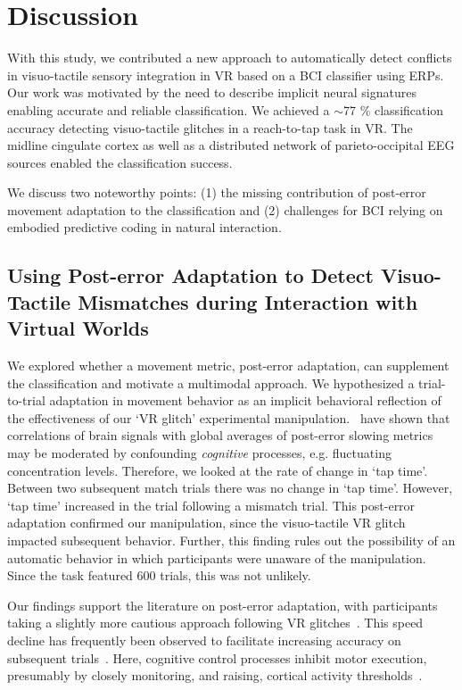 \section{Discussion}

With this study, we contributed a new approach to automatically detect conflicts in visuo-tactile sensory integration in VR based on a BCI classifier using ERPs. Our work was motivated by the need to describe implicit neural signatures enabling accurate and reliable classification. We achieved a $\sim$77 \% classification accuracy detecting visuo-tactile glitches in a reach-to-tap task in VR. The midline cingulate cortex as well as a distributed network of parieto-occipital EEG sources enabled the classification success.

We discuss two noteworthy points: (1) the missing contribution of post-error movement adaptation to the classification and (2) challenges for BCI relying on embodied predictive coding in natural interaction.

\subsection{Using Post-error Adaptation to Detect Visuo-Tactile Mismatches during Interaction with Virtual Worlds}

We explored whether a movement metric, post-error adaptation, can supplement the classification and motivate a multimodal approach. We hypothesized a trial-to-trial adaptation in movement behavior as an implicit behavioral reflection of the effectiveness of our `VR glitch' experimental manipulation.~\cite{Dutilh2012-ps} have shown that correlations of brain signals with global averages of post-error slowing metrics may be moderated by confounding \textit{cognitive} processes, e.g. fluctuating concentration levels. Therefore, we looked at the rate of change in `tap time'. Between two subsequent match trials there was no change in `tap time'. However, `tap time' increased in the trial following a mismatch trial. This post-error adaptation confirmed our manipulation, since the visuo-tactile VR glitch impacted subsequent behavior. Further, this finding rules out the possibility of an automatic behavior in which participants were unaware of the manipulation. Since the task featured 600 trials, this was not unlikely. 

Our findings support the literature on post-error adaptation, with participants taking a slightly more cautious approach following VR glitches~\cite{Rabbitt1977-yg}. This speed decline has frequently been observed to facilitate increasing accuracy on subsequent trials~\cite{Ridderinkhof2004-rz}. Here, cognitive control processes inhibit motor execution, presumably by closely monitoring, and raising, cortical activity thresholds~\cite{Botvinick2001-bs}.


